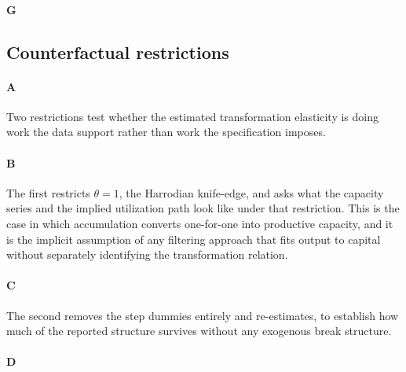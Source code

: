\paragraph{G}

\subsection{Counterfactual restrictions}

\paragraph{A}
Two restrictions test whether the estimated transformation elasticity is doing work the data support rather than work the specification imposes.

\paragraph{B}
The first restricts $\theta = 1$, the Harrodian knife-edge, and asks what the capacity series and the implied utilization path look like under that restriction. This is the case in which accumulation converts one-for-one into productive capacity, and it is the implicit assumption of any filtering approach that fits output to capital without separately identifying the transformation relation.

\paragraph{C}
The second removes the step dummies entirely and re-estimates, to establish how much of the reported structure survives without any exogenous break structure.

\paragraph{D}
